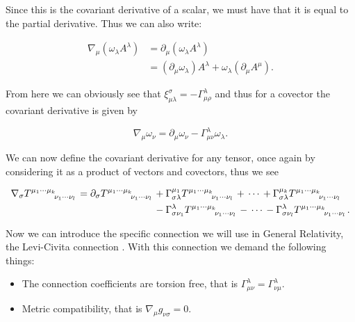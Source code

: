 Since this is the covariant derivative of a scalar, we must have that it is equal to the partial derivative. Thus we can also write:

\begin{equation} \label{covar-partial}
	\begin{aligned}
		\nabla_{\mu} (\omega_{\lambda} A^{\lambda}) &= \partial_{\mu} (\omega_{\lambda} A^{\lambda}) \\
		&= (\partial_{\mu} \omega_{\lambda}) A^{\lambda} + \omega_{\lambda} (\partial_{\mu} A^{\mu}) .
	\end{aligned}
\end{equation}

From here we can obviously see that \(\xi^{\sigma}_{\mu \lambda} = - \Gamma^{\lambda}_{\mu \rho}\) and thus for a covector the covariant derivative is given by \cite{carroll}

\begin{equation} \label{covar-diff}
	\nabla_{\mu} \omega_{\nu} = \partial_{\mu} \omega_{\nu} - \Gamma^{\lambda}_{\mu \nu} \omega_{\lambda} .
\end{equation}

We can now define the covariant derivative for any tensor, once again by considering it as a product of vectors and covectors, thus we see \cite{carroll}

\begin{equation} \label{tensor-diff}
	\begin{aligned}
	\nabla_{\sigma} T\indices{^{\mu_1}^\cdots^{\mu_k}_{\nu_1}_\cdots_{\nu_l}} = \partial_{\sigma} T\indices{^{\mu_1}^\cdots^{\mu_k}_{\nu_1}_\cdots_{\nu_l}}
	&+ \Gamma^{\mu_1}_{\sigma \lambda} T\indices{^{\mu_1}^\cdots^{\mu_k}_{\nu_1}_\cdots_{\nu_l}} + \, \cdots \, + \Gamma^{\mu_k}_{\sigma \lambda} T\indices{^{\mu_1}^\cdots^{\mu_k}_{\nu_1}_\cdots_{\nu_l}} \\
	&- \Gamma^{\lambda}_{\sigma \nu_1} T\indices{^{\mu_1}^\cdots^{\mu_k}_{\nu_1}_\cdots_{\nu_l}} - \, \cdots \, - \Gamma^{\lambda}_{\sigma \nu_l} T\indices{^{\mu_1}^\cdots^{\mu_k}_{\nu_1}_\cdots_{\nu_l}} .
	\end{aligned}
\end{equation}

Now we can introduce the specific connection we will use in General Relativity, the Levi-Civita connection \cite{carroll, szekeres}. With this connection we demand the following things:

\begin{itemize}
	\item The connection coefficients are torsion free, that is \(\Gamma^{\lambda}_{\mu \nu} = \Gamma^{\lambda}_{\nu \mu}\).
	\item Metric compatibility, that is \(\nabla_{\mu} g_{\nu \sigma} = 0\).
\end{itemize}

